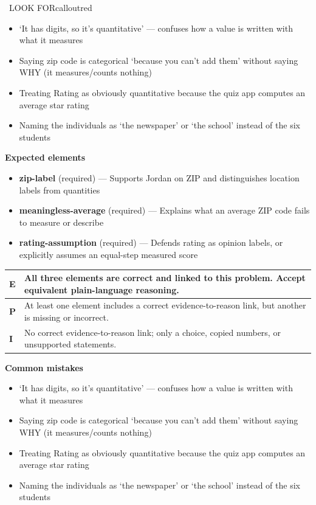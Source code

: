 \documentclass[11pt]{article}
\begin{document}
\begin{callout}{\IconWarn\ LOOK FOR}{calloutred}
\begin{itemize}[leftmargin=1.5em,itemsep=2pt,topsep=2pt]
  \item `It has digits, so it's quantitative' --- confuses how a value is written with what it measures
  \item Saying zip code is categorical `because you can't add them' without saying WHY (it measures/counts nothing)
  \item Treating Rating as obviously quantitative because the quiz app computes an average star rating
  \item Naming the individuals as `the newspaper' or `the school' instead of the six students
\end{itemize}
\end{callout}


\textbf{Expected elements}
\begin{itemize}[leftmargin=1.5em,itemsep=2pt,topsep=2pt]
  \item \textbf{zip-label} (required) --- Supports Jordan on ZIP and distinguishes location labels from quantities
  \item \textbf{meaningless-average} (required) --- Explains what an average ZIP code fails to measure or describe
  \item \textbf{rating-assumption} (required) --- Defends rating as opinion labels, or explicitly assumes an equal-step measured score
\end{itemize}

{\small\renewcommand{\arraystretch}{1.25}
\noindent\begin{tabular}{|p{0.5in}|p{5.9in}|}
\hline
\textbf{E} & All three elements are correct and linked to this problem. Accept equivalent plain-language reasoning. \\ \hline
\textbf{P} & At least one element includes a correct evidence-to-reason link, but another is missing or incorrect. \\ \hline
\textbf{I} & No correct evidence-to-reason link; only a choice, copied numbers, or unsupported statements. \\ \hline
\end{tabular}}

\textbf{Common mistakes}
\begin{itemize}[leftmargin=1.5em,itemsep=2pt,topsep=2pt]
  \item `It has digits, so it's quantitative' --- confuses how a value is written with what it measures
  \item Saying zip code is categorical `because you can't add them' without saying WHY (it measures/counts nothing)
  \item Treating Rating as obviously quantitative because the quiz app computes an average star rating
  \item Naming the individuals as `the newspaper' or `the school' instead of the six students
\end{itemize}
\end{document}

